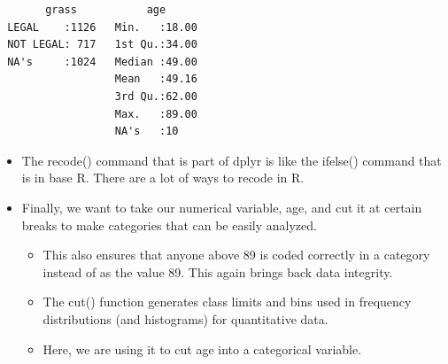 \documentclass[
  letterpaper,
  DIV=11,
  numbers=noendperiod]{scrreprt}
\providecommand{\tightlist}{%
  \setlength{\itemsep}{0pt}\setlength{\parskip}{0pt}}\usepackage{longtable,booktabs,array}
\begin{document}
\begin{verbatim}
       grass           age       
 LEGAL    :1126   Min.   :18.00  
 NOT LEGAL: 717   1st Qu.:34.00  
 NA's     :1024   Median :49.00  
                  Mean   :49.16  
                  3rd Qu.:62.00  
                  Max.   :89.00  
                  NA's   :10     
\end{verbatim}

\begin{itemize}
\item
  The recode() command that is part of dplyr is like the ifelse()
  command that is in base R. There are a lot of ways to recode in R.
\item
  Finally, we want to take our numerical variable, age, and cut it at
  certain breaks to make categories that can be easily analyzed.

  \begin{itemize}
  \tightlist
  \item
    This also ensures that anyone above 89 is coded correctly in a
    category instead of as the value 89. This again brings back data
    integrity.
  \item
    The cut() function generates class limits and bins used in frequency
    distributions (and histograms) for quantitative data.
  \item
    Here, we are using it to cut age into a categorical variable.
  \end{itemize}


\end{itemize}
\end{document}
